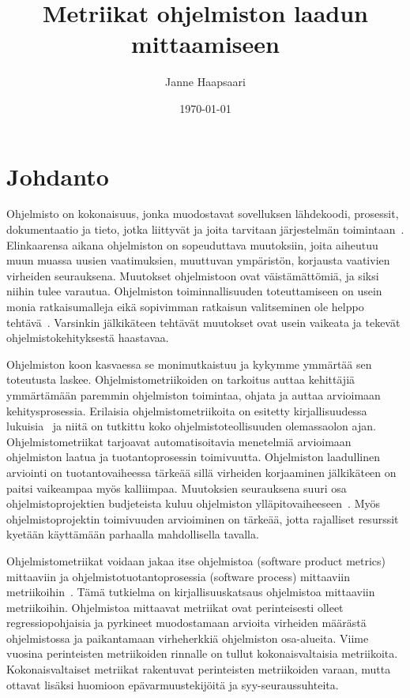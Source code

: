 \documentclass[finnish]{tktltiki2}
\title{Metriikat ohjelmiston laadun mittaamiseen}
\author{Janne Haapsaari}
\date{\today}
\theoremstyle{definition}
\theoremstyle{remark}
\begin{document}

\frontmatter      %

\maketitle        %
\makeabstract     %

\tableofcontents  %


\mainmatter       %

\section{Johdanto}

Ohjelmisto on kokonaisuus, jonka muodostavat sovelluksen lähdekoodi, prosessit, dokumentaatio ja tieto, jotka liittyvät ja joita tarvitaan järjestelmän toimintaan~\cite{IEEE90, ISO9000}. Elinkaarensa aikana ohjelmiston on sopeuduttava muutoksiin, joita aiheutuu muun muassa uusien vaatimuksien, muuttuvan ympäristön, korjausta vaativien virheiden seurauksena. Muutokset ohjelmistoon ovat väistämättömiä, ja siksi niihin tulee varautua. Ohjelmiston toiminnallisuuden toteuttamiseen on usein monia ratkaisumalleja eikä sopivimman ratkaisun valitseminen ole helppo tehtävä~\cite{CK94}. Varsinkin jälkikäteen tehtävät muutokset ovat usein vaikeata ja tekevät ohjelmistokehityksestä haastavaa.

Ohjelmiston koon kasvaessa se monimutkaistuu ja kykymme ymmärtää sen toteutusta laskee. Ohjelmistometriikoiden on tarkoitus auttaa kehittäjiä ymmärtämään paremmin ohjelmiston toimintaa, ohjata ja auttaa arvioimaan kehitysprosessia. Erilaisia ohjelmistometriikoita on esitetty kirjallisuudessa lukuisia~\cite{M76, H77, CK94, GKMS00, ZN08} ja niitä on tutkittu koko ohjelmistoteollisuuden olemassaolon ajan. Ohjelmistometriikat tarjoavat automatisoitavia menetelmiä arvioimaan ohjelmiston laatua ja tuotantoprosessin toimivuutta. Ohjelmiston laadullinen arviointi on tuotantovaiheessa tärkeää sillä virheiden korjaaminen jälkikäteen on paitsi vaikeampaa myös kalliimpaa. Muutoksien seurauksena suuri osa ohjelmistoprojektien budjeteista kuluu ohjelmiston ylläpitovaiheeseen~\cite{CALO94, G83}. Myös ohjelmistoprojektin toimivuuden arvioiminen on tärkeää, jotta rajalliset resurssit kyetään käyttämään parhaalla mahdollisella tavalla.

Ohjelmistometriikat voidaan jakaa itse ohjelmistoa (software product metrics) mittaaviin ja ohjelmistotuotantoprosessia (software process) mittaaviin metriikoihin~\cite{LH93}. Tämä tutkielma on kirjallisuuskatsaus ohjelmistoa mittaaviin metriikoihin. Ohjelmistoa mittaavat metriikat ovat perinteisesti olleet regressiopohjaisia ja pyrkineet muodostamaan arvioita virheiden määrästä ohjelmistossa ja paikantamaan virheherkkiä ohjelmiston osa-alueita. Viime vuosina perinteisten metriikoiden rinnalle on tullut kokonaisvaltaisia metriikoita. Kokonaisvaltaiset metriikat rakentuvat perinteisten metriikoiden varaan, mutta ottavat lisäksi huomioon epävarmuustekijöitä ja syy-seuraussuhteita.
\end{document}
